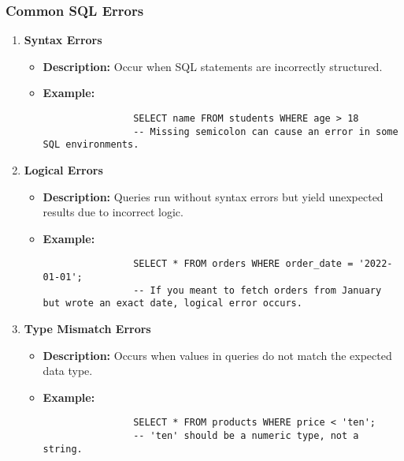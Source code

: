 \documentclass[aspectratio=169]{beamer}
\begin{document}
\begin{frame}[fragile]
    \frametitle{Common SQL Errors}
    \begin{enumerate}
        \item \textbf{Syntax Errors}
            \begin{itemize}
                \item \textbf{Description:} Occur when SQL statements are incorrectly structured.
                \item \textbf{Example:}
                \begin{lstlisting}
                SELECT name FROM students WHERE age > 18 
                -- Missing semicolon can cause an error in some SQL environments.
                \end{lstlisting}
            \end{itemize}
        
        \item \textbf{Logical Errors}
            \begin{itemize}
                \item \textbf{Description:} Queries run without syntax errors but yield unexpected results due to incorrect logic.
                \item \textbf{Example:}
                \begin{lstlisting}
                SELECT * FROM orders WHERE order_date = '2022-01-01';
                -- If you meant to fetch orders from January but wrote an exact date, logical error occurs.
                \end{lstlisting}
            \end{itemize}
        
        \item \textbf{Type Mismatch Errors}
            \begin{itemize}
                \item \textbf{Description:} Occurs when values in queries do not match the expected data type.
                \item \textbf{Example:}
                \begin{lstlisting}
                SELECT * FROM products WHERE price < 'ten'; 
                -- 'ten' should be a numeric type, not a string.
                \end{lstlisting}
            \end{itemize}
    \end{enumerate}
\end{frame}
\end{document}
